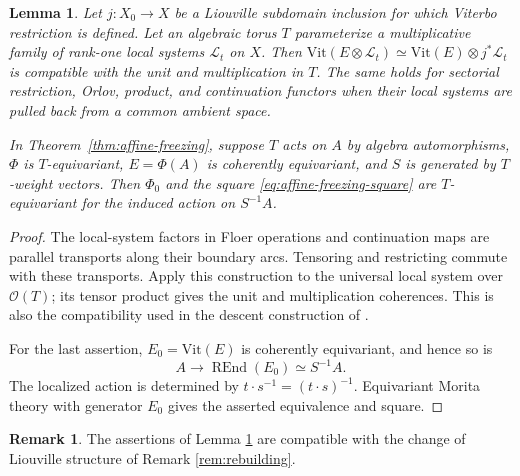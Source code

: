 \documentclass[12pt, letter]{amsart}
\newtheorem{lemma}[theorem]{Lemma}
\theoremstyle{definition}
\newtheorem{remark}[theorem]{Remark}
\newcommand{\OO}{\mathcal O}
\numberwithin{equation}{section}
\begin{document}
\begin{lemma}\label{lem:equivariant-localization}
Let $j:X_0\to X$ be a Liouville subdomain inclusion for which
Viterbo restriction is defined. Let an algebraic torus $T$
parameterize a multiplicative family of rank-one local systems
$\mathcal L_t$ on $X$. Then
$
 \mathrm{Vit}(E\otimes\mathcal L_t)
 \simeq\mathrm{Vit}(E)\otimes j^*\mathcal L_t$
is compatible with the unit and multiplication in $T$.
The same holds for sectorial restriction, Orlov, product, and
continuation functors when their local systems are pulled back
from a common ambient space.

In Theorem~\ref{thm:affine-freezing}, suppose $T$ acts on $A$
by algebra automorphisms, $\Phi$ is $T$-equivariant,
$E=\Phi(A)$ is coherently equivariant, and $S$ is generated
by $T$-weight vectors.
Then $\Phi_0$ and the square \eqref{eq:affine-freezing-square}
are $T$-equivariant for the induced action on $S^{-1}A$.
\end{lemma}
\begin{proof}
The local-system factors in Floer operations and continuation
maps are parallel transports along their boundary arcs.
Tensoring and restricting commute with these transports.
Apply this construction to the universal local system over
$\OO(T)$; its tensor product gives the unit and multiplication
coherences. This is also the compatibility used in the
descent construction of \cite[Section~5.5]{HS}.

For the last assertion, $E_0=\mathrm{Vit}(E)$ is coherently
equivariant, and hence so is
\[
 A\longrightarrow\operatorname{REnd}(E_0)\simeq S^{-1}A.
\]
The localized action is determined by $t\cdot s^{-1}=(t\cdot s)^{-1}$.
Equivariant Morita theory with generator $E_0$ gives the asserted
equivalence and square. 
\end{proof}

\begin{remark}
    The assertions of Lemma \ref{lem:equivariant-localization} are compatible with the change of Liouville structure of Remark \ref{rem:rebuilding}. 
\end{remark}
\end{document}
